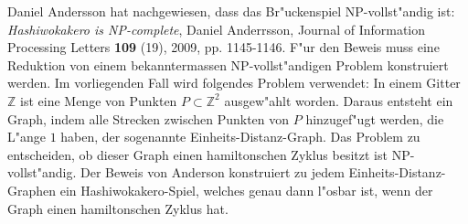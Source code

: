 \begin{diskussion}
Daniel Andersson hat nachgewiesen, dass das Br"uckenspiel
NP-vollst"andig ist: {\it Hashiwokakero is NP-complete},
Daniel Anderrsson, Journal of Information Processing Letters {\bf 109} (19),
2009, pp. 1145-1146.
F"ur den Beweis muss eine Reduktion von einem bekanntermassen
NP-vollst"andigen Problem konstruiert werden.
Im vorliegenden Fall wird folgendes Problem verwendet:
In einem Gitter $\mathbb Z$ ist eine Menge von Punkten $P\subset \mathbb Z^2$
ausgew"ahlt worden.
Daraus entsteht ein Graph, indem alle Strecken zwischen Punkten von $P$
hinzugef"ugt werden, die L"ange $1$ haben,
der sogenannte Einheits-Distanz-Graph.
Das Problem zu entscheiden,
ob dieser Graph einen hamiltonschen Zyklus besitzt ist NP-vollst"andig.
Der Beweis von Anderson konstruiert zu jedem Einheits-Distanz-Graphen
ein Hashiwokakero-Spiel, welches genau dann l"osbar ist, wenn der
Graph einen hamiltonschen Zyklus hat.
\end{diskussion}
